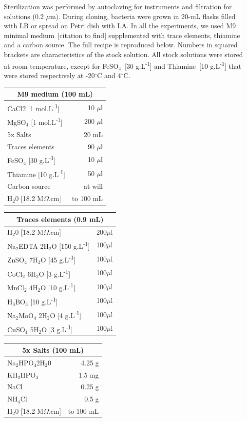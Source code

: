 Sterilization was performed by autoclaving for instruments and filtration for solutions (0.2 $\mu$m).
During cloning, bacteria were grown in 20-mL flasks filled with LB or spread on Petri dish with LA.
In all the experiments, we used M9 minimal medium~[citation to find] supplemented with trace elements, thiamine and a carbon source.
The full recipe is reproduced below.
Numbers in squared brackets are characteristics of the stock solution.
All stock solutions were stored at room temperature, except for FeSO$_4$~[30 g.L\textsuperscript{-1}] and Thiamine~[10 g.L\textsuperscript{-1}] that were stored respectively at -20$^\circ$C and 4$^\circ$C.
\begin{center}
\begin{tabular}{|l r|}
  \hline
  \multicolumn{2}{|c|}{\textbf{M9 medium (100 mL)}}\\
  \hline
  CaCl2 [1 mol.L\textsuperscript{-1}] & 10 $\mu$l\\
  MgSO$_4$ [1 mol.L\textsuperscript{-1}] & 200 $\mu$l\\
   5x Salts & 20 mL \\
  Traces elements & 90 $\mu$l \\
  FeSO$_4$ [30 g.L\textsuperscript{-1}] & 10 $\mu$l \\
  Thiamine [10 g.L\textsuperscript{-1}] & 50 $\mu$l \\
  Carbon source & at will \\
  H$_2$0 [18.2 M$\Omega$.cm] & to 100 mL \\
  \hline
\end{tabular}
\begin{tabular}{|l r|}
  \hline
  \multicolumn{2}{|c|}{\textbf{Traces elements (0.9 mL)}}\\
  \hline
  H$_2$0 [18.2 M$\Omega$.cm] & 200$\mu$l\\
  Na$_2$EDTA 2H$_2$O [150 g.L\textsuperscript{-1}] & 100$\mu$l\\
  ZnSO$_4$ 7H$_2$O [45 g.L\textsuperscript{-1}] & 100$\mu$l\\
  CoCl$_2$ 6H$_2$O [3 g.L\textsuperscript{-1}] & 100$\mu$l\\
  MnCl$_2$ 4H$_2$O [10 g.L\textsuperscript{-1}] & 100$\mu$l\\
  H$_3$BO$_3$ [10 g.L\textsuperscript{-1}] & 100$\mu$l\\
  Na$_2$MoO$_4$ 2H$_2$O [4 g.L\textsuperscript{-1}] & 100$\mu$l\\
  CuSO$_4$ 5H$_2$O [3 g.L\textsuperscript{-1}] & 100$\mu$l\\
  \hline
\end{tabular}
\begin{tabular}{|l r|}
    \hline
  \multicolumn{2}{|c|}{\textbf{5x Salts (100 mL)}}\\
  \hline
  Na$_2$HPO$_4$2H$_2$0 & 4.25 g \\
  KH$_2$HPO$_4$ & 1.5 mg \\
  NaCl & 0.25 g\\
  NH$_4$Cl& 0.5 g\\
  H$_2$0 [18.2 M$\Omega$.cm] & to 100 mL \\
  \hline
\end{tabular}
\end{center}

